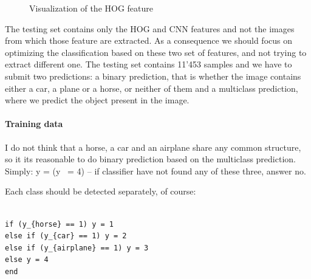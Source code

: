 \documentclass{article} %
\begin{document}
\begin{figure}[!t]
	\centering
	\hspace{10pt}
	\caption{Visualization of the HOG feature}
\end{figure}

The testing set contains only the HOG and CNN features and not the images from which those feature are extracted.
As a consequence we should focus on optimizing the classification based on these two set of features, and not trying to extract different one.
The testing set contains 11'453 samples and we have to submit two predictions: a binary prediction, that is whether the image contains either a car, a plane or a horse, or neither of them and a multiclass 
prediction, where we predict the object present in the image.

\paragraph{Training data}

I do not think that a horse, a car and an airplane share any common structure, so it its reasonable to do binary prediction based on the multiclass prediction. Simply:
y = (y ~= 4)  -- if classifier have not found any of these three, answer no.

Each class should be detected separately, of course:

\begin{lstlisting}

if (y_{horse} == 1) y = 1
else if (y_{car} == 1) y = 2
else if (y_{airplane} == 1) y = 3
else y = 4
end
\end{lstlisting}
\end{document}
